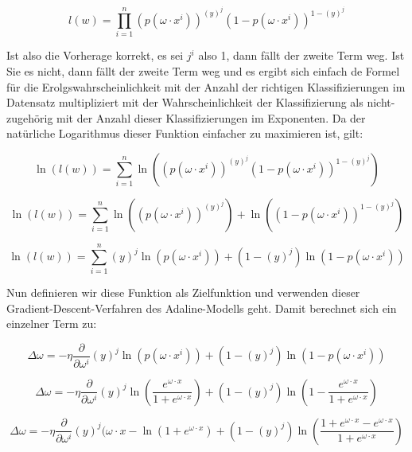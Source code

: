 \documentclass[11pt]{article} %
\begin{document}
\begin{equation}
l(w) = \prod_{i = 1}^n (p(\omega \cdot x^i))^{(y)^j} (1-p(\omega\cdot x^i))^{1-(y)^j}
\end{equation} 

Ist also die Vorherage korrekt, es sei $j^i$ also 1, dann fällt der zweite Term weg. Ist Sie es nicht, dann fällt der zweite Term weg und es ergibt sich einfach de Formel für die Erolgswahrscheinlichkeit mit der Anzahl der richtigen Klassifizierungen im Datensatz multipliziert
mit der Wahrscheinlichkeit der Klassifizierung als nicht-zugehörig mit der Anzahl dieser Klassifizierungen im Exponenten. Da der natürliche Logarithmus dieser Funktion einfacher zu maximieren ist, gilt:

\begin{equation}
\ln(l(w)) = \sum_{i = 1}^n \ln((p(\omega \cdot x^i))^{(y)^j} (1-p(\omega\cdot x^i))^{1-(y)^j})
\end{equation} 

\begin{equation}
\ln(l(w)) = \sum_{i = 1}^n \ln((p(\omega \cdot x^i))^{(y)^j}) + \ln((1-p(\omega\cdot x^i))^{1-(y)^j})
\end{equation} 

\begin{equation}
\ln(l(w)) = \sum_{i = 1}^n (y)^j \ln(p(\omega \cdot x^i)) + (1-(y)^j) \ln(1-p(\omega\cdot x^i))
\end{equation} 

Nun definieren wir diese Funktion als Zielfunktion und verwenden dieser Gradient-Descent-Verfahren des Adaline-Modells geht. Damit berechnet sich ein einzelner Term zu:

\begin{equation}
\Delta \omega = -\eta \frac{\partial}{\partial \omega^i}  (y)^j \ln(p(\omega \cdot x^i)) + (1-(y)^j) \ln(1-p(\omega\cdot x^i))
\end{equation}

\begin{equation}
\Delta \omega = -\eta \frac{\partial}{\partial \omega^i}  (y)^j \ln( \frac{e^{\omega \cdot x}}{1+e^{\omega \cdot x}}) + (1-(y)^j) \ln(1- \frac{e^{\omega \cdot x}}{1+e^{\omega \cdot x}})
\end{equation}

\begin{equation}
\Delta \omega = -\eta \frac{\partial}{\partial \omega^i}  (y)^j (\omega \cdot x - \ln(1+e^{\omega \cdot x}) + (1-(y)^j) \ln( \frac{1+e^{\omega \cdot x}-e^{\omega \cdot x}}{1+e^{\omega \cdot x}})
\end{equation}
\end{document}
